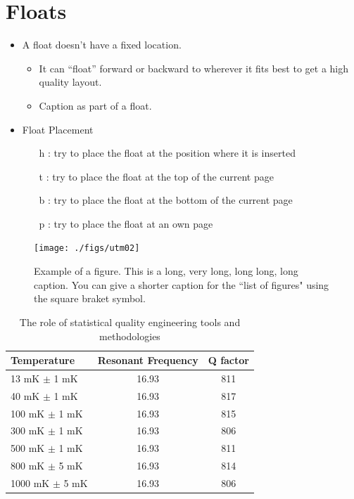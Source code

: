 \documentclass[twoside]{utmthesis}
\begin{document}
\section{Floats}
\begin{itemize}
\item A float doesn't have a fixed location. 
\begin{itemize}
\item It can ``float'' forward or backward to wherever it fits best to
get a high quality layout. 
\item Caption as part of a float.
\end{itemize}
\item Float Placement
\begin{itemize}
\item [h]: try to place the float at the
position where it is inserted 
\item [t]: try to place the float at the top
of the current page
\item [b]: try to place the float at the
bottom of the current page
\item [p]: try to place the float at an own
page 
\end{itemize}
\end{itemize}

\begin{figure}[!ht]
	\centering
	\texttt{[image: ./figs/utm02]}
	\caption{Example of a figure. This is a long, very long, long long, long caption.  You can give a shorter caption for the ``list of figures" using the square braket symbol.}
\end{figure}


\begin{table}[!ht]
\centering
\caption{The role of statistical quality engineering tools and methodologies}
\vspace{\baselineskip}
\begin{tabular}{l c c}
  \hline
  \hline
  Temperature & Resonant Frequency & Q factor\\
  \hline
  13 mK $\pm$ 1 mK & 16.93 & 811 \\
  40 mK $\pm$ 1 mK & 16.93 & 817 \\
  100 mK $\pm$ 1 mK & 16.93 & 815 \\
  300 mK $\pm$ 1 mK & 16.93 & 806\\
  500 mK $\pm$ 1 mK & 16.93 & 811\\
  800 mK $\pm$ 5 mK & 16.93 & 814\\
  1000 mK $\pm$ 5 mK & 16.93 & 806 \\
  \hline
  \hline
\end{tabular}
\end{table}
\end{document}
